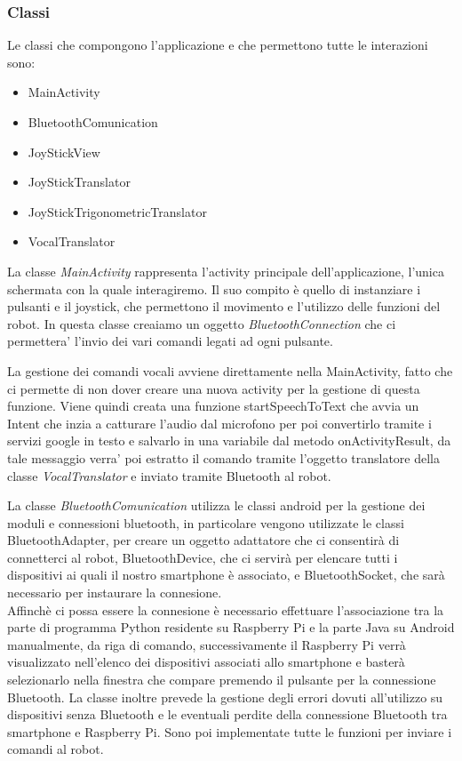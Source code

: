 \documentclass[12pt]{article}
\newcommand{\raspi}{Raspberry Pi}
\begin{document}
\newpage
\subsubsection{Classi}

Le classi che compongono l'applicazione e che permettono tutte le interazioni sono:
\begin{itemize}
\item MainActivity 
\item BluetoothComunication
\item JoyStickView
\item JoyStickTranslator
\item JoyStickTrigonometricTranslator
\item VocalTranslator
\end{itemize}


La classe \emph{MainActivity} rappresenta l'activity principale dell'applicazione, l'unica schermata con la quale interagiremo. 
Il suo compito è quello di instanziare i pulsanti e il joystick, che permettono il movimento e l'utilizzo delle funzioni del robot.
In questa classe creaiamo un oggetto \emph{BluetoothConnection} che ci permettera' l'invio dei vari comandi legati ad ogni pulsante.

La gestione dei comandi vocali avviene direttamente nella MainActivity, fatto che ci permette di non dover creare una nuova activity per la gestione di questa funzione. Viene quindi creata una funzione startSpeechToText che avvia un Intent che inzia a catturare l'audio dal microfono per poi convertirlo tramite i servizi google in testo e salvarlo in una variabile dal metodo onActivityResult, da tale messaggio verra' poi estratto il comando tramite l'oggetto translatore della classe \emph{VocalTranslator} e inviato tramite Bluetooth al robot.

\medskip

La classe \emph{BluetoothComunication} utilizza le classi android per la gestione dei moduli e connessioni bluetooth, in particolare
vengono utilizzate le classi BluetoothAdapter, per creare un oggetto adattatore che ci consentirà di connetterci al robot, BluetoothDevice, che ci servirà per elencare tutti i dispositivi ai quali il nostro smartphone è associato, e BluetoothSocket, che sarà necessario per instaurare la connesione.\\
Affinchè ci possa essere la connesione è necessario effettuare l'associazione tra la parte di programma Python residente su \raspi{} e la parte Java su Android manualmente, da riga di comando, successivamente il \raspi{} verrà visualizzato nell'elenco dei dispositivi associati allo smartphone e basterà selezionarlo nella finestra che compare premendo il pulsante per la connessione Bluetooth.
La classe inoltre prevede la gestione degli errori dovuti all'utilizzo su dispositivi senza Bluetooth e le eventuali perdite della connessione Bluetooth tra smartphone e \raspi{}. Sono poi implementate tutte le funzioni per inviare i comandi al robot.
\end{document}
